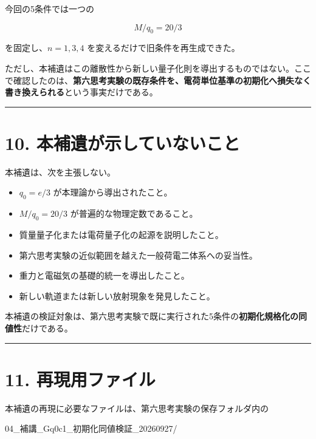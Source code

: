 \documentclass[
  a4paper,
]{ltjsarticle}
\newenvironment{Shaded}{}{}
\newcommand{\NormalTok}[1]{#1}
\providecommand{\tightlist}{%
  \setlength{\itemsep}{0pt}\setlength{\parskip}{0pt}}
\begin{document}
今回の5条件では一つの

\[
M/q_0=20/3
\]

を固定し、\(n=1,3,4\) を変えるだけで旧条件を再生成できた。

ただし、本補遺はこの離散性から新しい量子化則を導出するものではない。ここで確認したのは、\textbf{第六思考実験の既存条件を、電荷単位基準の初期化へ損失なく書き換えられる}という事実だけである。

\begin{center}\rule{0.5\linewidth}{0.5pt}\end{center}

\section{10.
本補遺が示していないこと}\label{ux672cux88dcux907aux304cux793aux3057ux3066ux3044ux306aux3044ux3053ux3068}

本補遺は、次を主張しない。

\begin{itemize}
\tightlist
\item
  \(q_0=e/3\) が本理論から導出されたこと。
\item
  \(M/q_0=20/3\) が普遍的な物理定数であること。
\item
  質量量子化または電荷量子化の起源を説明したこと。
\item
  第六思考実験の近似範囲を越えた一般荷電二体系への妥当性。
\item
  重力と電磁気の基礎的統一を導出したこと。
\item
  新しい軌道または新しい放射現象を発見したこと。
\end{itemize}

本補遺の検証対象は、第六思考実験で既に実行された5条件の\textbf{初期化規格化の同値性}だけである。

\begin{center}\rule{0.5\linewidth}{0.5pt}\end{center}

\section{11.
再現用ファイル}\label{ux518dux73feux7528ux30d5ux30a1ux30a4ux30eb}

本補遺の再現に必要なファイルは、第六思考実験の保存フォルダ内の

\begin{Shaded}
\begin{Highlighting}[]
\NormalTok{04\_補講\_Gq0c1\_初期化同値検証\_20260927/}
\end{Highlighting}
\end{Shaded}
\end{document}
